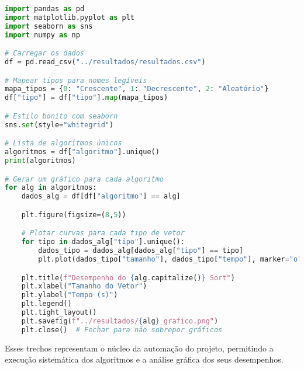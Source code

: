 \begin{lstlisting}[language=Python, caption={Geração de gráficos com base nos dados}, label={lst:plot}]
import pandas as pd
import matplotlib.pyplot as plt
import seaborn as sns
import numpy as np

# Carregar os dados
df = pd.read_csv("../resultados/resultados.csv")

# Mapear tipos para nomes legíveis
mapa_tipos = {0: "Crescente", 1: "Decrescente", 2: "Aleatório"}
df["tipo"] = df["tipo"].map(mapa_tipos)

# Estilo bonito com seaborn
sns.set(style="whitegrid")

# Lista de algoritmos únicos
algoritmos = df["algoritmo"].unique()
print(algoritmos)

# Gerar um gráfico para cada algoritmo
for alg in algoritmos:
    dados_alg = df[df["algoritmo"] == alg]

    plt.figure(figsize=(8,5))

    # Plotar curvas para cada tipo de vetor
    for tipo in dados_alg["tipo"].unique():
        dados_tipo = dados_alg[dados_alg["tipo"] == tipo]
        plt.plot(dados_tipo["tamanho"], dados_tipo["tempo"], marker="o", label=tipo)

    plt.title(f"Desempenho do {alg.capitalize()} Sort")
    plt.xlabel("Tamanho do Vetor")
    plt.ylabel("Tempo (s)")
    plt.legend()
    plt.tight_layout()
    plt.savefig(f"../resultados/{alg}_grafico.png")
    plt.close()  # Fechar para não sobrepor gráficos
\end{lstlisting}

Esses trechos representam o núcleo da automação do projeto, permitindo a execução sistemática dos algoritmos e a análise gráfica dos seus desempenhos.

